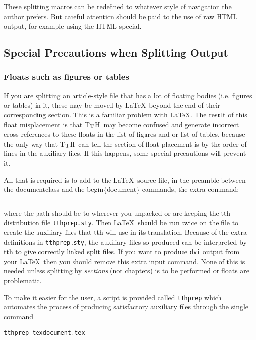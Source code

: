 \documentclass[12pt]{article}
\def\tth{T$_{\rm T}$H}
\begin{document}
These splitting macros can be redefined to whatever style of
navigation the author prefers. But careful attention should be paid to
the use of raw HTML output, for example using the HTML special.


\subsection{Special Precautions when Splitting Output}

\subsubsection{Floats such as figures or tables}
If you are splitting an article-style file that has a lot of
floating bodies (i.e. figures or tables) in it, these may be moved by
\LaTeX\ beyond the end of their corresponding section. This is a
familiar problem with \LaTeX. The result of this float misplacement
is that \tth\ may become confused and generate incorrect
cross-references to these floats in the list of figures and or list of
tables, because the only way that \tth\ can tell the section of float
placement is by the order of lines in the auxiliary files. If this
happens, some special precautions will prevent it. 

All that is required is to add to the \LaTeX\ source file, in the
preamble between the documentclass and the begin\{document\} commands,
the extra command:

\begin{verbatim}

\end{verbatim}

\noindent where the path should be to wherever you unpacked or are
keeping the tth distribution file \verb!tthprep.sty!. Then \LaTeX\ should
be run twice on the file to create the auxiliary files that tth will
use in its translation. Because of the extra definitions in
\verb!tthprep.sty!, the auxiliary files so produced can be interpreted by
tth to give correctly linked split files. If you want to produce
\verb!dvi! output from your \LaTeX\ then you should remove this extra
input command.  None of this is needed unless splitting by {\em
sections\/} (not chapters) is to be performed or floats are
problematic.

To make it easier for the user, a script is provided called
\verb!tthprep! which automates the process of producing satisfactory
auxiliary files through the single command

\begin{verbatim}
tthprep texdocument.tex
\end{verbatim}
\end{document}
